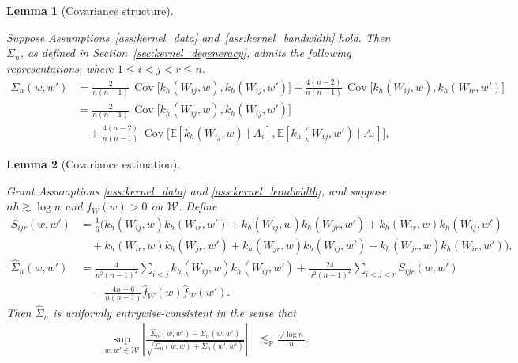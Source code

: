 \documentclass[11pt,lof]{puthesis}
\renewcommand{\P}{\ensuremath{\mathbb{P}}}
\newcommand{\E}{\ensuremath{\mathbb{E}}}
\newcommand{\cW}{\ensuremath{\mathcal{W}}}
\DeclareMathOperator{\Cov}{Cov}
\theoremstyle{break}
\newtheorem{lemma}{Lemma}[section]
\theoremstyle{proof}
\begin{document}
\begin{lemma}[Covariance structure]
  \label{lem:kernel_app_covariance_structure}

  Suppose Assumptions~\ref{ass:kernel_data} and~\ref{ass:kernel_bandwidth}
  hold. Then $\Sigma_n$, as defined in Section~\ref{sec:kernel_degeneracy},
  admits the following representations,
  where $1 \leq i < j < r \leq n$.
  \begin{align*}
    \Sigma_n(w,w')
    &=
    \frac{2}{n(n-1)}
    \,\Cov\!\big[
      k_h(W_{i j},w),
      k_h(W_{i j},w')
    \big]
    +
    \frac{4(n-2)}{n(n-1)}
    \,\Cov\!\big[
      k_h(W_{i j},w),
      k_h(W_{i r},w')
    \big] \\
    &=
    \frac{2}{n(n-1)}
    \,\Cov\!\big[
      k_h(W_{i j},w),
      k_h(W_{i j},w')
    \big] \\
    &\quad+
    \frac{4(n-2)}{n(n-1)}
    \,\Cov\!\big[
      \E[k_h(W_{i j},w) \mid A_i],
      \E[k_h(W_{i j},w') \mid A_i]
    \big],
  \end{align*}
\end{lemma}

\begin{lemma}[Covariance estimation]
  \label{lem:kernel_app_covariance_estimation}

  Grant Assumptions \ref{ass:kernel_data} and \ref{ass:kernel_bandwidth},
  and suppose $n h \gtrsim \log n$ and $f_W(w) > 0$ on $\cW$. Define
  \begin{align*}
    S_{i j r}(w,w')
    &=
    \frac{1}{6}
    \Big(
      k_h(W_{i j},w)
      k_h(W_{i r},w')
      + k_h(W_{i j},w)
      k_h(W_{jr},w')
      + k_h(W_{i r},w)
      k_h(W_{i j},w') \\
      &\quad+
      k_h(W_{i r},w)
      k_h(W_{jr},w')
      + k_h(W_{jr},w)
      k_h(W_{i j},w')
      + k_h(W_{jr},w)
      k_h(W_{i r},w')
    \Big), \\
    \hat \Sigma_n(w,w')
    &=
    \frac{4}{n^2(n-1)^2}
    \sum_{i<j}
    k_h(W_{i j},w)
    k_h(W_{i j},w')
    +
    \frac{24}{n^2(n-1)^2}
    \sum_{i<j<r}
    S_{i j r}(w,w') \\
    &\quad-
    \frac{4n-6}{n(n-1)}
    \hat f_W(w)
    \hat f_W(w').
  \end{align*}
  Then $\hat \Sigma_n$
  is uniformly entrywise-consistent in the sense that
  \begin{align*}
    \sup_{w,w' \in \cW}
    \left|
      \frac{\hat \Sigma_n(w,w') - \Sigma_n(w,w')}
      {\sqrt{\Sigma_n(w,w) + \Sigma_n(w',w')}}
    \right|
    &\lesssim_\P
    \frac{\sqrt{\log n}}{n}.
  \end{align*}

\end{lemma}
\end{document}
